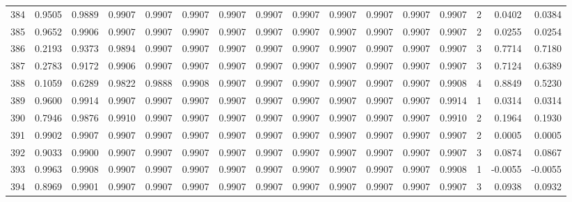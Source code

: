 \begin{tabular}{lrrrrrrrrrrrrrrr}
384 &      0.9505 &  0.9889 &  0.9907 &  0.9907 &  0.9907 &  0.9907 &  0.9907 &  0.9907 &  0.9907 &  0.9907 &   0.9907 &     0.9907 &      2 &                    0.0402 &                     0.0384 \\
385 &      0.9652 &  0.9906 &  0.9907 &  0.9907 &  0.9907 &  0.9907 &  0.9907 &  0.9907 &  0.9907 &  0.9907 &   0.9907 &     0.9907 &      2 &                    0.0255 &                     0.0254 \\
386 &      0.2193 &  0.9373 &  0.9894 &  0.9907 &  0.9907 &  0.9907 &  0.9907 &  0.9907 &  0.9907 &  0.9907 &   0.9907 &     0.9907 &      3 &                    0.7714 &                     0.7180 \\
387 &      0.2783 &  0.9172 &  0.9906 &  0.9907 &  0.9907 &  0.9907 &  0.9907 &  0.9907 &  0.9907 &  0.9907 &   0.9907 &     0.9907 &      3 &                    0.7124 &                     0.6389 \\
388 &      0.1059 &  0.6289 &  0.9822 &  0.9888 &  0.9908 &  0.9907 &  0.9907 &  0.9907 &  0.9907 &  0.9907 &   0.9907 &     0.9908 &      4 &                    0.8849 &                     0.5230 \\
389 &      0.9600 &  0.9914 &  0.9907 &  0.9907 &  0.9907 &  0.9907 &  0.9907 &  0.9907 &  0.9907 &  0.9907 &   0.9907 &     0.9914 &      1 &                    0.0314 &                     0.0314 \\
390 &      0.7946 &  0.9876 &  0.9910 &  0.9907 &  0.9907 &  0.9907 &  0.9907 &  0.9907 &  0.9907 &  0.9907 &   0.9907 &     0.9910 &      2 &                    0.1964 &                     0.1930 \\
391 &      0.9902 &  0.9907 &  0.9907 &  0.9907 &  0.9907 &  0.9907 &  0.9907 &  0.9907 &  0.9907 &  0.9907 &   0.9907 &     0.9907 &      2 &                    0.0005 &                     0.0005 \\
392 &      0.9033 &  0.9900 &  0.9907 &  0.9907 &  0.9907 &  0.9907 &  0.9907 &  0.9907 &  0.9907 &  0.9907 &   0.9907 &     0.9907 &      3 &                    0.0874 &                     0.0867 \\
393 &      0.9963 &  0.9908 &  0.9907 &  0.9907 &  0.9907 &  0.9907 &  0.9907 &  0.9907 &  0.9907 &  0.9907 &   0.9907 &     0.9908 &      1 &                   -0.0055 &                    -0.0055 \\
394 &      0.8969 &  0.9901 &  0.9907 &  0.9907 &  0.9907 &  0.9907 &  0.9907 &  0.9907 &  0.9907 &  0.9907 &   0.9907 &     0.9907 &      3 &                    0.0938 &                     0.0932 \\

\end{tabular}
